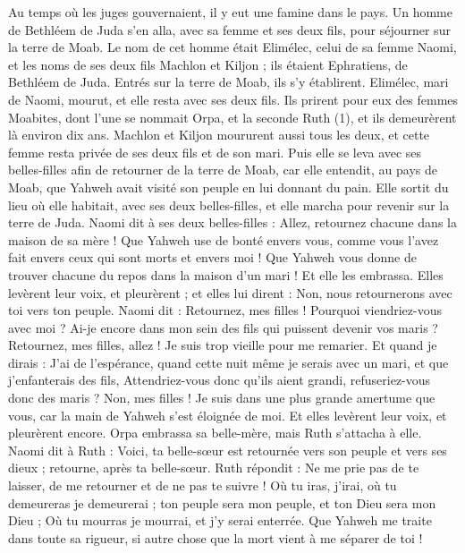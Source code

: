 \BFont
\begin{multicols}{2}
\VerseOne{}Au temps où les juges gouvernaient, il y eut une famine dans le pays. Un homme de Bethléem de Juda s'en alla, avec sa femme et ses deux fils, pour séjourner sur la terre de Moab.
Le nom de cet homme était Elimélec, celui de sa femme Naomi, et les noms de ses deux fils Machlon et Kiljon ; ils étaient Ephratiens, de Bethléem de Juda. Entrés sur la terre de Moab, ils s’y établirent.
Elimélec, mari de Naomi, mourut, et elle resta avec ses deux fils.
Ils prirent pour eux des femmes Moabites, dont l'une se nommait Orpa, et la seconde Ruth (1), et ils demeurèrent là environ dix ans.
Machlon et Kiljon moururent aussi tous les deux, et cette femme resta privée de ses deux fils et de son mari.
Puis elle se leva avec ses belles-filles afin de retourner de la terre de Moab, car elle entendit, au pays de Moab, que Yahweh avait visité son peuple en lui donnant du pain.
Elle sortit du lieu où elle habitait, avec ses deux belles-filles, et elle marcha pour revenir sur la terre de Juda.
Naomi dit à ses deux belles-filles : Allez, retournez chacune dans la maison de sa mère ! Que Yahweh use de bonté envers vous, comme vous l'avez fait envers ceux qui sont morts et envers moi !
Que Yahweh vous donne de trouver chacune du repos dans la maison d'un mari ! Et elle les embrassa. Elles levèrent leur voix, et pleurèrent ;
et elles lui dirent : Non, nous retournerons avec toi vers ton peuple.
Naomi dit : Retournez, mes filles ! Pourquoi viendriez-vous avec moi ? Ai-je encore dans mon sein des fils qui puissent devenir vos maris ?
Retournez, mes filles, allez ! Je suis trop vieille pour me remarier. Et quand je dirais : J'ai de l'espérance, quand cette nuit même je serais avec un mari, et que j'enfanterais des fils,
Attendriez-vous donc qu'ils aient grandi, refuseriez-vous donc des maris ? Non, mes filles ! Je suis dans une plus grande amertume que vous, car la main de Yahweh s'est éloignée de moi.
Et elles levèrent leur voix, et pleurèrent encore. Orpa embrassa sa belle-mère, mais Ruth s’attacha à elle.
Naomi dit à Ruth : Voici, ta belle-sœur est retournée vers son peuple et vers ses dieux ; retourne, après ta belle-sœur.
Ruth répondit : Ne me prie pas de te laisser, de me retourner et de ne pas te suivre ! Où tu iras, j'irai, où tu demeureras je demeurerai ; ton peuple sera mon peuple, et ton Dieu sera mon Dieu ;
Où tu mourras je mourrai, et j'y serai enterrée. Que Yahweh me traite dans toute sa rigueur, si autre chose que la mort vient à me séparer de toi !

\end{multicols}
